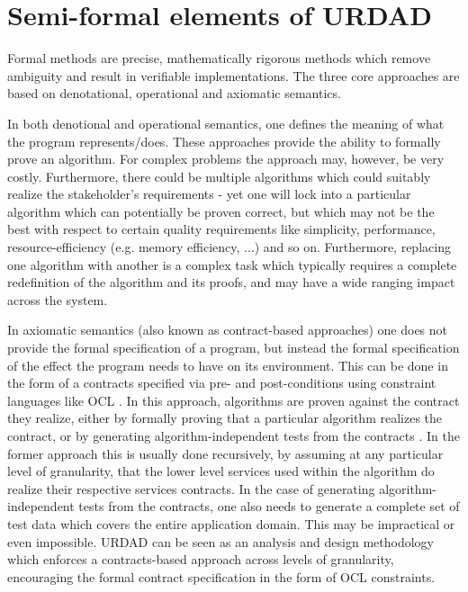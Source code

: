 \section{Semi-formal elements of URDAD}
\label{sec:semiFormalElements}

Formal methods \cite{Monin:understandingFormalMethods, hinchey:softwareEngineeringAndFormalMethods}
are precise, mathematically
rigorous methods which remove ambiguity and result in verifiable implementations.
The three core approaches are based on denotational, operational
and axiomatic semantics.

In both denotional and operational semantics, one defines the meaning of what the
program represents/does. These approaches provide the ability to formally prove
an algorithm. For complex problems the approach may, however, be very costly.
Furthermore, there could be multiple algorithms which could suitably realize the stakeholder's
requirements - yet one will lock into a particular algorithm which
can potentially be proven correct, but which may not be the best with respect to certain
quality requirements like simplicity, performance, resource-efficiency (e.g. memory
efficiency, ...) and so on. Furthermore, replacing one algorithm with another is a complex task
which typically requires a complete redefinition of the algorithm and its proofs, and
may have a wide ranging impact across the system.

In axiomatic semantics (also known as contract-based approaches) one does not provide the formal specification of a program, but instead the formal specification of the effect the program needs to have on its environment. This can be done in the form of a contracts specified via pre- and post-conditions using constraint languages like OCL
\cite{Briand:investigationOfFormalityInUmlBaedDevelopment}. In this approach, algorithms are
proven against the contract they realize, either by formally proving that a particular algorithm realizes the contract, or by generating algorithm-independent tests from the contracts
\cite{meyer:programsThatTestThemselves}. In the former approach this is usually done recursively,
by assuming at any particular level of granularity, that the lower level services used within
the algorithm do realize their respective services contracts. In the case of generating
algorithm-independent tests from the contracts, one also needs to generate a complete set of
test data which covers the entire application domain. This may be impractical or even
impossible. URDAD can be seen as an analysis and design methodology which enforces a contracts-based
approach across levels of granularity, encouraging the formal contract specification
in the form of OCL constraints.

